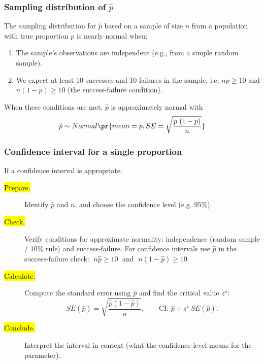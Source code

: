 \documentclass[t,compress,mathserif]{beamer}
\begin{document}

\begin{frame}
\frametitle{Sampling distribution of \(\hat{p}\)}

The sampling distribution for \(\hat{p}\) based on a sample of size \(n\) from a population with true proportion \(p\) is nearly normal when:

\begin{enumerate}
  \item The sample's observations are independent (e.g., from a simple random sample).
  \item We expect at least 10 successes and 10 failures in the sample, i.e. \(np \ge 10\) and \(n(1-p) \ge 10\) (the success-failure condition).
\end{enumerate}

When these conditions are met, \(\hat{p}\) is approximately normal with
\[ \hat{p} \sim Normal \pr{ mean = p, SE = \sqrt{\frac{p~(1-p)}{n}} } \]

\end{frame}


\begin{frame}
\frametitle{Confidence interval for a single proportion}

If a confidence interval is appropriate:

\begin{description}
  \item[\hl{Prepare.}] Identify $\hat{p}$ and $n$, and choose the confidence level (e.g. 95\%).
  \item[\hl{Check.}] Verify conditions for approximate normality: independence (random sample / 10\% rule) and success-failure. For confidence intervals use $\hat{p}$ in the success-failure check: $\;n\hat{p}\ge10\;$ and $\;n(1-\hat{p})\ge10$.
  \item[\hl{Calculate.}] Compute the standard error using $\hat{p}$ and find the critical value $z^\star$:
  \[
    SE(\hat{p})=\sqrt{\dfrac{\hat{p}(1-\hat{p})}{n}}, \qquad
    \text{CI: }\hat{p}\pm z^\star \,SE(\hat{p}).
  \]
  \item[\hl{Conclude.}] Interpret the interval in context (what the confidence level means for the parameter).
\end{description}

\end{frame}

\end{document}
